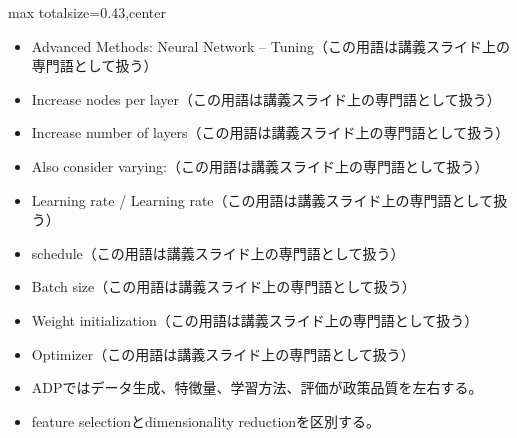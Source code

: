 \clearpage
{}
\begin{minipage}[t]{0.405\textwidth}
\begin{adjustbox}{max totalsize={\textwidth}{0.43\textheight},center}
\begin{minipage}{\textwidth}\scriptsize
{}\begin{itemize}
\item Advanced Methods: Neural Network – Tuning（この用語は講義スライド上の専門語として扱う）
\item Increase nodes per layer（この用語は講義スライド上の専門語として扱う）
\item Increase number of layers（この用語は講義スライド上の専門語として扱う）
\item Also consider varying:（この用語は講義スライド上の専門語として扱う）
\item Learning rate / Learning rate（この用語は講義スライド上の専門語として扱う）
\item schedule（この用語は講義スライド上の専門語として扱う）
\item Batch size（この用語は講義スライド上の専門語として扱う）
\item Weight initialization（この用語は講義スライド上の専門語として扱う）
\item Optimizer（この用語は講義スライド上の専門語として扱う）
\end{itemize}\begin{itemize}
\item ADPではデータ生成、特徴量、学習方法、評価が政策品質を左右する。
\item feature selectionとdimensionality reductionを区別する。
\end{itemize}
\end{minipage}
\end{adjustbox}
\end{minipage}\hfill
